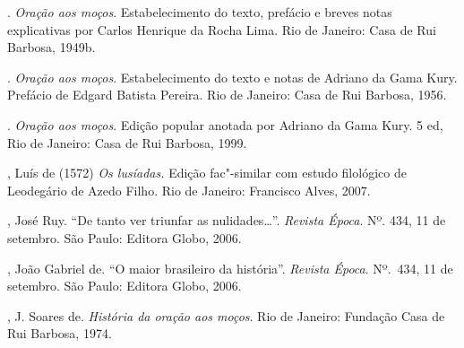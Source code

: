 \begin{bibliohedra}
\titidem. \textit{Oração aos moços}. Estabelecimento do texto,
prefácio e breves notas explicativas por Carlos Henrique da Rocha Lima.
Rio de Janeiro: Casa de Rui Barbosa, 1949b.

\titidem. \textit{Oração aos moços}. Estabelecimento do texto e
notas de Adriano da Gama Kury. Prefácio de Edgard Batista Pereira. Rio
de Janeiro: Casa de Rui Barbosa, 1956.

\titidem. \textit{Oração aos moços}. Edição popular anotada por
Adriano da Gama Kury. 5 ed, Rio de Janeiro: Casa de Rui Barbosa, 1999.

, Luís de (1572) \textit{Os lusíadas.} Edição fac"-similar com
estudo filológico de Leodegário de Azedo Filho. Rio de Janeiro:
Francisco Alves, 2007.

, José Ruy. ``De tanto ver triunfar as nulidades\ldots{}''.
\textit{Revista Época}. Nº. 434, 11 de setembro. São Paulo:
Editora Globo, 2006.

, João Gabriel de. “O maior brasileiro da história”. \textit{Revista
Época}. Nº.~434, 11 de setembro. São Paulo: Editora Globo, 2006.

, J. Soares de.  \textit{História da oração aos moços}. Rio de
Janeiro: Fundação Casa de Rui Barbosa, 1974.
\end{bibliohedra}




